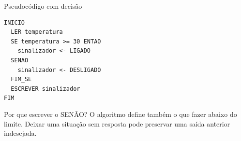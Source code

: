 \begin{frame}[fragile,t]{Pseudocódigo com decisão}
\begin{lstlisting}[language={}]
INICIO
  LER temperatura
  SE temperatura >= 30 ENTAO
    sinalizador <- LIGADO
  SENAO
    sinalizador <- DESLIGADO
  FIM_SE
  ESCREVER sinalizador
FIM
\end{lstlisting}
\begin{block}{Por que escrever o SENÃO?}
O algoritmo define também o que fazer abaixo do limite. Deixar uma situação sem resposta pode preservar uma saída anterior indesejada.
\end{block}
\end{frame}

